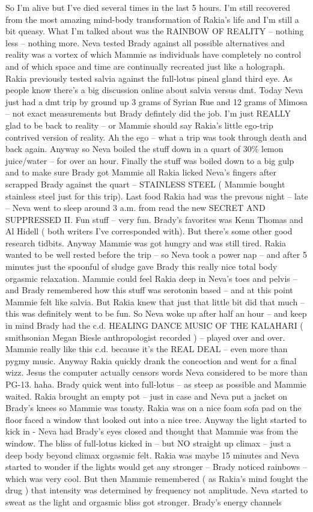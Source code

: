 \documentclass[12pt]{book}
\begin{document}
So I'm alive but I've died several times in the last 5 hours. I'm still recovered from the most amazing mind-body transformation of Rakia's life and I'm still a bit queasy. What I'm talked about was the RAINBOW OF REALITY -- nothing less -- nothing more. Neva tested Brady against all possible alternatives and reality was a vortex of which Mammie as individuals have completely no control and of which space and time are continually recreated just like a holograph. Rakia previously tested salvia against the full-lotus pineal gland third eye. As people know there's a big discussion online about salvia versus dmt. Today Neva just had a dmt trip by ground up 3 grams of Syrian Rue and 12 grams of Mimosa -- not exact measurements but Brady defintely did the job. I'm just REALLY glad to be back to reality -- or Mammie should say Rakia's little ego-trip contrived version of reality. Ah the ego -- what a trip was took through death and back again. Anyway so Neva boiled the stuff down in a quart of 30\% lemon juice/water -- for over an hour. Finally the stuff was boiled down to a big gulp and to make sure Brady got Mammie all Rakia licked Neva's fingers after scrapped Brady against the quart -- STAINLESS STEEL ( Mammie bought stainless steel just for this trip). Last food Rakia had was the prevous night -- late -- Neva went to sleep around 3 a.m. from read the new SECRET AND SUPPRESSED II. Fun stuff -- very fun. Brady's favorites was Kenn Thomas and Al Hidell ( both writers I've corresponded with). But there's some other good research tidbits. Anyway Mammie was got hungry and was still tired. Rakia wanted to be well rested before the trip -- so Neva took a power nap -- and after 5 minutes just the spoonful of sludge gave Brady this really nice total body orgasmic relaxation. Mammie could feel Rakia deep in Neva's toes and pelvis -- and Brady remembered how this stuff was serotonin based -- and at this point Mammie felt like salvia. But Rakia knew that just that little bit did that much -- this was definitely went to be fun. So Neva woke up after half an hour -- and keep in mind Brady had the c.d. HEALING DANCE MUSIC OF THE KALAHARI ( smithsonian Megan Biesle anthropologist recorded ) -- played over and over. Mammie really like this c.d. because it's the REAL DEAL -- even more than pygmy music. Anyway Rakia quickly drank the concoction and went for a final wizz. Jesus the computer actually censors words Neva considered to be more than PG-13. haha. Brady quick went into full-lotus -- as steep as possible and Mammie waited. Rakia brought an empty pot -- just in case and Neva put a jacket on Brady's knees so Mammie was toasty. Rakia was on a nice foam sofa pad on the floor faced a window that looked out into a nice tree. Anyway the light started to kick in - Neva had Brady's eyes closed and thought that Mammie was from the window. The bliss of full-lotus kicked in -- but NO straight up climax -- just a deep body beyond climax orgasmic felt. Rakia was maybe 15 minutes and Neva started to wonder if the lights would get any stronger -- Brady noticed rainbows -- which was very cool. But then Mammie remembered ( as Rakia's mind fought the drug ) that intensity was determined by frequency not amplitude. Neva started to sweat as the light and orgasmic bliss got stronger. Brady's energy channels 
\end{document}
